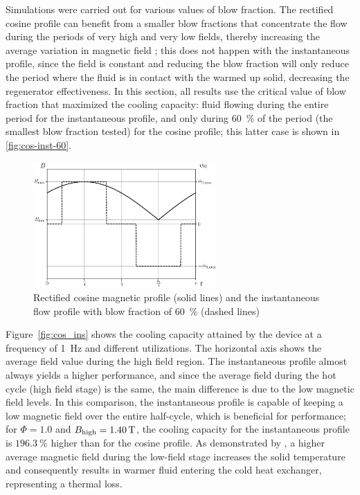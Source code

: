 \documentclass[referee]{svjour3}
\begin{document}
Simulations were carried out for various values of blow fraction. The rectified cosine profile can benefit from a smaller blow fractions that concentrate the flow during the periods of very high and very low fields, thereby increasing the average variation in magnetic field \cite{bib:nakashima18-influen-exp}; this does not happen with the instantaneous profile, since the field is constant and reducing the blow fraction will only reduce the period where the fluid is in contact with the warmed up solid, decreasing the regenerator effectiveness. In this section, all results use the critical value of blow fraction that maximized the cooling capacity: fluid flowing during the entire period for the instantaneous profile, and only during \SI{60}{\percent} of the period (the smallest blow fraction tested) for the cosine profile; this latter case is shown in \autoref{fig:cos-inst-60}.

\begin{figure}[!ht]
  \centering
  \includegraphics[width=7cm]{Fig6-profiles_rc_and_flow_instantaneous}
  \caption{Rectified cosine magnetic profile (solid lines) and the instantaneous flow profile  with blow fraction of \SI{60}{\percent} (dashed lines)}
  \label{fig:cos-inst-60}
\end{figure}

Figure~\ref{fig:cos_ins} shows the cooling capacity attained by the device at a frequency of \SI{1}{\hertz} and different utilizations. The horizontal axis shows the average field value during the high field region. The instantaneous profile almost always yields a higher performance, and since the average field during the hot cycle (high field stage) is the same, the main difference is due to the low magnetic field levels. In this comparison, the instantaneous profile is capable of keeping a low magnetic field over the entire half-cycle, which is beneficial for performance;  for $\Phi=1.0$ and $B_{\mathrm{high}} = \SI{1.40}{\tesla}$, the cooling capacity for the instantaneous profile is $\SI{196.3}{\percent}$ higher than for the cosine profile.  As demonstrated by \cite{bib:asme-mce}, a higher average magnetic field during the low-field stage increases the solid temperature and consequently results in  warmer fluid entering the cold heat exchanger, representing a thermal loss. 
\end{document}
